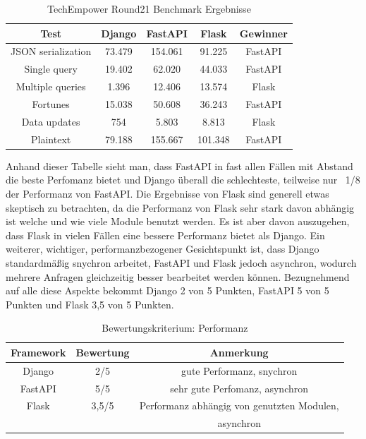 \documentclass[letterpaper,11pt,leqno]{article}
\begin{document}
\begin{table}[h!]
	\begin{center}
		\begin{tabular}{|c||c|c|c|c|}
			\hline
			Test & Django & FastAPI & Flask & Gewinner\\
			\hline\hline
			JSON serialization & 73.479 & 154.061 & 91.225 & FastAPI\\
			Single query & 19.402 & 62.020 & 44.033 & FastAPI\\
			Multiple queries & 1.396 & 12.406 & 13.574 & Flask\\
			Fortunes & 15.038 & 50.608 & 36.243 & FastAPI\\
			Data updates & 754 & 5.803 & 8.813 & Flask\\
			Plaintext & 79.188 & 155.667 & 101.348 & FastAPI\\
			\hline
		\end{tabular}
		\caption{TechEmpower Round21 Benchmark Ergebnisse}
	\end{center}
	\label{table:7}
\end{table}

Anhand dieser Tabelle sieht man, dass FastAPI in fast allen Fällen mit Abstand die beste Perfomanz bietet und Django überall die
schlechteste, teilweise nur ~1/8 der Performanz von FastAPI. Die Ergebnisse von Flask sind generell etwas skeptisch zu betrachten,
da die Performanz von Flask sehr stark davon abhängig ist welche und wie viele Module benutzt werden. Es ist aber davon auszugehen,
dass Flask in vielen Fällen eine bessere Performanz bietet als Django. Ein weiterer, wichtiger, performanzbezogener Gesichtspunkt
ist, dass Django standardmäßig snychron arbeitet, FastAPI und Flask jedoch asynchron, wodurch mehrere Anfragen gleichzeitig besser
bearbeitet werden können. Bezugnehmend auf alle diese Aspekte bekommt Django 2 von 5 Punkten, FastAPI 5 von 5 Punkten und Flask
3,5 von 5 Punkten.

\begin{table}[h!]
	\begin{center}
		\begin{tabular}{|c||c|c|}
			\hline
			Framework & Bewertung & Anmerkung\\
			\hline\hline
			Django & 2/5 & gute Performanz, snychron\\
			FastAPI & 5/5 & sehr gute Perfomanz, asynchron\\
			Flask & 3,5/5 & Performanz abhängig von genutzten Modulen,\\
			& & asynchron\\
			\hline
		\end{tabular}
		\caption{Bewertungskriterium: Performanz}
	\end{center}
	\label{table:8}
\end{table}
\end{document}
